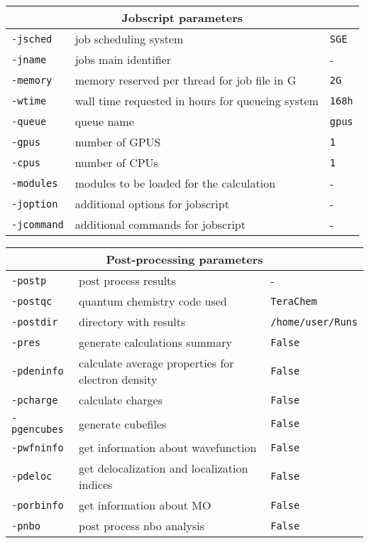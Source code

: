 \begin{tabular}{|p{4.5cm}|p{8cm}|p{3cm}|}
\hline
\multicolumn{3}{|c|}{\Large \textbf{Jobscript parameters}}\\ \hline                        
\texttt{-jsched} & job scheduling system & \texttt{SGE} \\
\texttt{-jname} & jobs main identifier & - \\
\texttt{-memory} & memory reserved per thread for job file in G & \texttt{2G} \\
\texttt{-wtime} & wall time requested in hours for queueing system  & \texttt{168h} \\
\texttt{-queue} & queue name & \texttt{gpus} \\
\texttt{-gpus} & number of GPUS & \texttt{1} \\
\texttt{-cpus} & number of CPUs  & \texttt{1} \\
\texttt{-modules} &  modules to be loaded for the calculation & - \\
\texttt{-joption} & additional options for jobscript & - \\
\texttt{-jcommand} & additional commands for jobscript & - \\
\hline
\end{tabular}
\begin{tabular}{|p{4.5cm}|p{8cm}|p{3cm}|}
\hline
\multicolumn{3}{|c|}{\Large\textbf{Post-processing parameters}}\\ \hline
\texttt{-postp} & post process results & - \\
\texttt{-postqc} & quantum chemistry code used & \texttt{TeraChem} \\
\texttt{-postdir} & directory with results & \texttt{/home/user/Runs} \\
\texttt{-pres} & generate calculations summary & \texttt{False} \\
\texttt{-pdeninfo} &  calculate average properties for electron density & \texttt{False} \\
\texttt{-pcharge} &   calculate charges & \texttt{False} \\
\texttt{-pgencubes} & generate cubefiles & \texttt{False} \\
\texttt{-pwfninfo} & get information about wavefunction & \texttt{False} \\
\texttt{-pdeloc} &     get delocalization and localization indices & \texttt{False} \\
\texttt{-porbinfo} & get information about MO & \texttt{False} \\
\texttt{-pnbo} & post process nbo analysis & \texttt{False} \\
\hline
\end{tabular}


